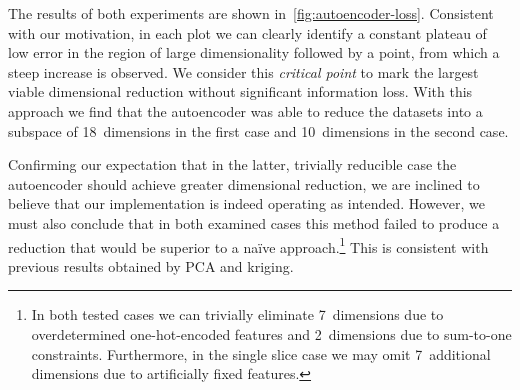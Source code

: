 The results of both experiments are shown in~\cref{fig:autoencoder-loss}.
Consistent with our motivation, in each plot we can clearly identify a constant
plateau of low error in the region of large dimensionality followed by a point,
from which a steep increase is observed.
We consider this \textit{critical point} to mark the largest viable
dimensional reduction without significant information loss.
With this approach we find that the autoencoder was able to reduce the
datasets into a subspace of 18~dimensions in the first case and 10~dimensions in
the second case.

Confirming our expectation that in the latter, trivially reducible case the
autoencoder should achieve greater dimensional reduction, we are inclined to
believe that our implementation is indeed operating as intended. However, we
must also conclude that in both examined cases this method failed to produce a
reduction that would be superior to a naïve approach.\footnote{In both tested cases we
	can trivially eliminate 7~dimensions due to overdetermined one-hot-encoded
	features and 2~dimensions due to sum-to-one constraints. Furthermore, in the
	single slice case we may omit 7~additional dimensions due to artificially fixed
features.} This is consistent with previous results obtained by PCA and kriging.



